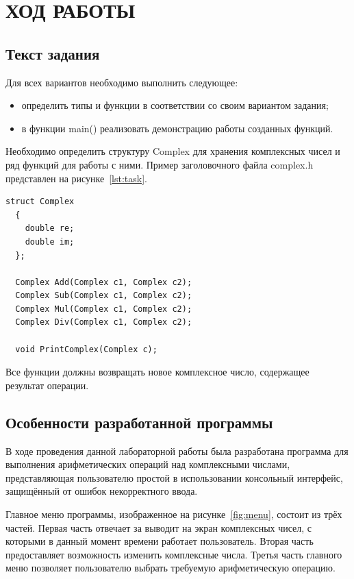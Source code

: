 \section{ХОД РАБОТЫ}

\subsection{Текст задания}

Для всех вариантов необходимо выполнить следующее: 

\begin{itemize}

  \item определить типы и функции в соответствии со своим вариантом задания;
  \item в функции main() реализовать демонстрацию работы созданных функций.

\end{itemize}

Необходимо определить структуру Complex для хранения комплексных чисел и ряд функций для работы с ними. Пример заголовочного файла complex.h представлен на рисунке~\ref{lst:task}. 

\begin{lstlisting}[caption=Пример описания структуры Complex и объявления функций,label=lst:task]
  struct Complex
  {
    double re;
    double im;
  };

  Complex Add(Complex c1, Complex c2);
  Complex Sub(Complex c1, Complex c2);
  Complex Mul(Complex c1, Complex c2);
  Complex Div(Complex c1, Complex c2);
  
  void PrintComplex(Complex c);
\end{lstlisting}

Все функции должны возвращать новое комплексное число, содержащее результат операции.

\subsection{Особенности разработанной программы}

В ходе проведения данной лабораторной работы была разработана программа для выполнения арифметических операций над комплексными числами, представляющая пользователю простой в использовании консольный интерфейс, защищённый от ошибок некорректного ввода.

Главное меню программы, изображенное на рисунке~\ref{fig:menu}, состоит из трёх частей. Первая часть отвечает за выводит на экран комплексных чисел, с которыми в данный момент времени работает пользователь. Вторая часть предоставляет возможность изменить комплексные числа. Третья часть главного меню позволяет пользователю выбрать требуемую арифметическую операцию. 

